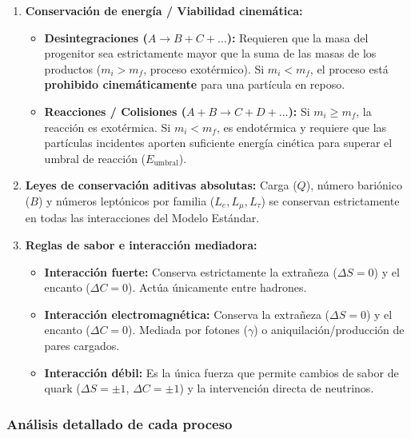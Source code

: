 \begin{problema}
\begin{enumerate}[label=\arabic*.]
    \item \textbf{Conservación de energía / Viabilidad cinemática:}
    \begin{itemize}
        \item \textbf{Desintegraciones ($A \to B + C + \dots$):} Requieren que la masa del progenitor sea estrictamente mayor que la suma de las masas de los productos ($m_i > m_f$, proceso exotérmico). Si $m_i < m_f$, el proceso está \textbf{prohibido cinemáticamente} para una partícula en reposo.
        \item \textbf{Reacciones / Colisiones ($A + B \to C + D + \dots$):} Si $m_i \ge m_f$, la reacción es exotérmica. Si $m_i < m_f$, es endotérmica y requiere que las partículas incidentes aporten suficiente energía cinética para superar el umbral de reacción ($E_{\text{umbral}}$).
    \end{itemize}
    \item \textbf{Leyes de conservación aditivas absolutas:} Carga ($Q$), número bariónico ($B$) y números leptónicos por familia ($L_e, L_\mu, L_\tau$) se conservan estrictamente en todas las interacciones del Modelo Estándar.
    \item \textbf{Reglas de sabor e interacción mediadora:}
    \begin{itemize}
        \item \textbf{Interacción fuerte:} Conserva estrictamente la extrañeza ($\Delta S = 0$) y el encanto ($\Delta C = 0$). Actúa únicamente entre hadrones.
        \item \textbf{Interacción electromagnética:} Conserva la extrañeza ($\Delta S = 0$) y el encanto ($\Delta C = 0$). Mediada por fotones ($\gamma$) o aniquilación/producción de pares cargados.
        \item \textbf{Interacción débil:} Es la única fuerza que permite cambios de sabor de quark ($\Delta S = \pm 1$, $\Delta C = \pm 1$) y la intervención directa de neutrinos.
    \end{itemize}
\end{enumerate}

\subsubsection*{Análisis detallado de cada proceso}


\end{problema}
